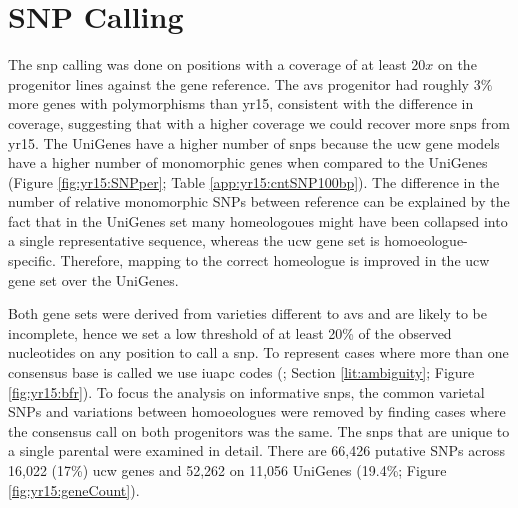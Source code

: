 \section{SNP Calling}
\label{yr15:snpCalling}

The \gls{snp} calling was done on positions with a coverage of at least $20x$ on the progenitor lines against the gene reference. The \gls{avs} progenitor had roughly $3\%$ more genes with polymorphisms than \gls{yr15}, consistent with the difference in coverage, suggesting that with a higher coverage we could recover more \gls{snp}s from \gls{yr15}.
The UniGenes have a higher number of \gls{snp}s because the \gls{ucw} gene models have a higher number of monomorphic genes when compared to the UniGenes (Figure \ref{fig:yr15:SNPper}; Table \ref{app:yr15:cntSNP100bp}). 
The difference in the number of relative monomorphic SNPs between reference can be explained by the fact that in the UniGenes set many homeologoues might have been collapsed into a single representative sequence, whereas the \acrshort{ucw} gene set is homoeologue-specific.
Therefore, mapping to the correct homeologue is improved in the \acrshort{ucw} gene set over the UniGenes.





Both gene sets were derived from varieties different to \gls{avs} and are likely to be incomplete, hence we set a low threshold of at least 20\% of the observed nucleotides on any position to call a \gls{snp}. 
To represent cases where more than one consensus base is called we use \gls{iuapc} codes (\citet{Cornish-Bowden1985}; Section \ref{lit:ambiguity}; Figure \ref{fig:yr15:bfr}).  
To focus the analysis on informative \gls{snp}s, the common varietal SNPs and variations between homoeologues were removed by finding cases where the consensus call on both progenitors was the same. 
The \gls{snp}s that are unique to a single parental were examined in detail. 
There are 66,426 putative \gls{SNP}s across 16,022 (17\%) \gls{ucw} genes and 52,262  on 11,056 UniGenes (19.4\%; Figure \ref{fig:yr15:geneCount}).  

